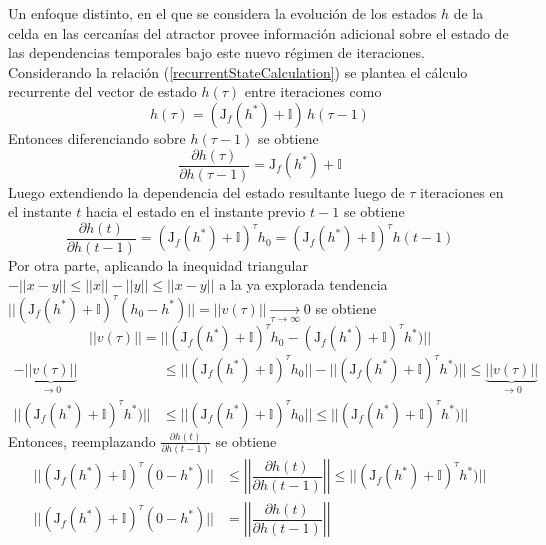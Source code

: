 \documentclass{article}
\begin{document}
	Un enfoque distinto, en el que se considera la evolución de los estados $h$ de la celda en las cercanías del atractor provee información adicional sobre el estado de las dependencias temporales bajo este nuevo régimen de iteraciones.\\
	Considerando la relación (\ref{recurrentStateCalculation}) se plantea el cálculo recurrente del vector de estado $h(\tau)$ entre iteraciones como
	\begin{equation*}
	h(\tau) = (\mathrm{J}_f(h^*) + \mathbb{I}) \, h(\tau-1)
	\end{equation*}
	Entonces diferenciando sobre $h(\tau-1)$ se obtiene
	\begin{equation*}
	\dfrac{\partial h(\tau)}{\partial h(\tau-1)} = \mathrm{J}_f(h^*) + \mathbb{I}
	\end{equation*}
	Luego extendiendo la dependencia del estado resultante luego de $\tau$ iteraciones en el instante $t$ hacia el estado en el instante previo $t-1$ se obtiene
	\begin{equation*}
	\dfrac{\partial h(t)}{\partial h(t-1)} = (\mathrm{J}_f(h^*) + \mathbb{I})^\tau h_0 = (\mathrm{J}_f(h^*) + \mathbb{I})^\tau h(t-1)
	\end{equation*}
	Por otra parte, aplicando la inequidad triangular $- ||x - y|| \le ||x|| - ||y|| \le ||x - y||$ a la ya explorada tendencia $||(\mathrm{J}_f(h^*) + \mathbb{I})^\tau (h_0 - h^*)||=||v(\tau)|| \xrightarrow[\tau \to \infty]{} 0$ se obtiene
	\begin{equation*}
	||v(\tau)|| = ||(\mathrm{J}_f(h^*) + \mathbb{I})^\tau h_0 - (\mathrm{J}_f(h^*) + \mathbb{I})^\tau h^*)||
	\end{equation*}
	\begin{equation*}
	\begin{split}
	- \underbrace{||v(\tau)||}_{\rightarrow 0} &\le ||(\mathrm{J}_f(h^*) + \mathbb{I})^\tau h_0|| - ||(\mathrm{J}_f(h^*) + \mathbb{I})^\tau h^*)|| \le \underbrace{||v(\tau)||}_{\rightarrow 0}\\
	||(\mathrm{J}_f(h^*) + \mathbb{I})^\tau h^*)|| &\le ||(\mathrm{J}_f(h^*) + \mathbb{I})^\tau h_0|| \le ||(\mathrm{J}_f(h^*) + \mathbb{I})^\tau h^*)||
	\end{split}
	\end{equation*}
	Entonces, reemplazando $\frac{\partial h(t)}{\partial h(t-1)}$ se obtiene
	\begin{equation*}
	\begin{split}
	||(\mathrm{J}_f(h^*) + \mathbb{I})^\tau (0 - h^*)|| &\le \left\lvert\left\lvert \dfrac{\partial h(t)}{\partial h(t-1)} \right\rvert\right\rvert \le ||(\mathrm{J}_f(h^*) + \mathbb{I})^\tau h^*)|| \\
	||(\mathrm{J}_f(h^*) + \mathbb{I})^\tau (0 - h^*)|| &= \left\lvert\left\lvert \dfrac{\partial h(t)}{\partial h(t-1)} \right\rvert\right\rvert
	\end{split}
	\end{equation*} 
\end{document}
